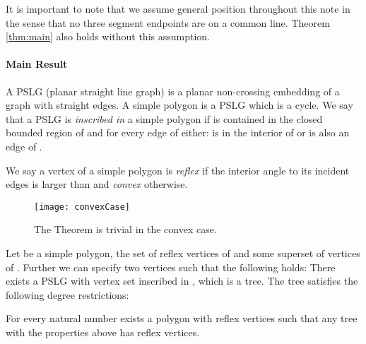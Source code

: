 \documentclass[12pt]{article}
\begin{document}
It is important to note that we assume general position throughout this note in the sense that no three segment endpoints are on a common line. Theorem \ref{thm:main} also holds without this assumption.


\paragraph{Main Result}
A PSLG (planar straight line graph) is a planar non-crossing embedding of a graph with straight edges. 
A simple polygon is a PSLG which is a cycle. We say that a PSLG  is \emph{inscribed in} a simple polygon  if   is contained in the closed bounded region of  and for every edge  of  either:  is in the interior of  or
  is also an edge of .

We say a vertex of a simple polygon is \emph{reflex} if the interior angle to its incident edges is larger than  and \emph{convex} otherwise. 
	\begin{figure}[h]
			\begin{center}
			\texttt{[image: convexCase]}
				\caption{The Theorem is trivial in the convex case.}
				\label{fig:convexCase}
			\end{center}
	\end{figure} 
\begin{theorem}\label{thm:main}
	Let  be a simple polygon,  the set of reflex vertices of  and  some superset of vertices of . Further we can specify two vertices  such that the following holds:
	There exists a PSLG  with vertex set  inscribed in , which is a tree. The tree  satisfies the following degree restrictions:

	For every natural number  exists a polygon with  reflex vertices
	such that any tree with the properties above has  reflex vertices.
\end{theorem}
\end{document}
